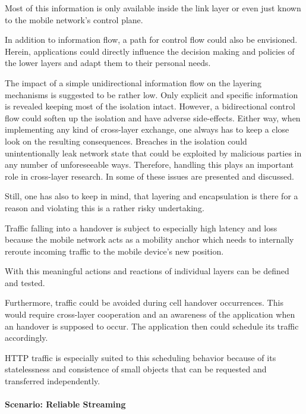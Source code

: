 

Most of this information is only available inside the link layer or even just known to the mobile network's control plane.

In addition to information flow, a path for control flow could also be envisioned. Herein, applications could directly influence the decision making and policies of the lower layers and adapt them to their personal needs.

The impact of a simple unidirectional information flow on the layering mechanisms is suggested to be rather low. Only explicit and specific information is revealed keeping most of the isolation intact. However, a bidirectional control flow could soften up the isolation and have adverse side-effects. Either way, when implementing any kind of cross-layer exchange, one always has to keep a close look on the resulting consequences. Breaches in the isolation could unintentionally leak network state that could be exploited by malicious parties in any number of unforeseeable ways. Therefore, handling this plays an important role in cross-layer research. In \cite{1404568} some of these issues are presented and discussed.


Still, one has also to keep in mind, that layering and encapsulation is there for a reason and violating this is a rather risky undertaking.


Traffic falling into a handover is subject to especially high latency and loss because the mobile network acts as a mobility anchor which needs to internally reroute incoming traffic to the mobile device's new position. 

With this meaningful actions and reactions of individual layers can be defined and tested.

Furthermore, traffic could be avoided during cell handover occurrences. 
This would require cross-layer cooperation and an awareness of the application when an handover is supposed to occur.
The application then could schedule its traffic accordingly. 

\gls{HTTP} traffic is especially suited to this scheduling behavior because of its statelessness and consistence of small objects that can be requested and transferred independently.

\paragraph{Scenario: Reliable Streaming}


